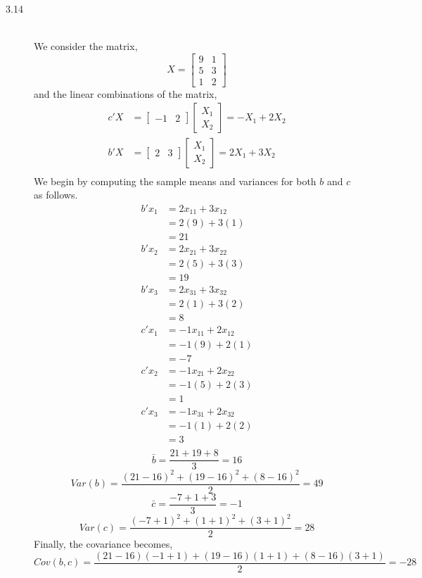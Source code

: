 \documentclass[letterpaper,10pt]{article}
\begin{document}
\begin{description}
\item[3.14]\hfill\\
We consider the matrix,
\[X=\begin{bmatrix}
9 & 1\\5 & 3\\1 & 2
\end{bmatrix} \]
and the linear combinations of the matrix,
\begin{align*}
c'X &=\begin{bmatrix}
-1 & 2
\end{bmatrix}\begin{bmatrix}
X_1\\X_2
\end{bmatrix}=-X_1+2X_2\\
b'X&=\begin{bmatrix}
2 & 3
\end{bmatrix}\begin{bmatrix}
X_1\\X_2
\end{bmatrix}=2X_1+3X_2\\
\end{align*}
We begin by computing the sample means and variances for both $b$ and $c$ as follows.
\begin{align*}
b'x_1 &= 2x_{11}+3x_{12}\\
&=2(9)+3(1)\\
&=21\\
b'x_2 &= 2x_{21}+3x_{22}\\
&=2(5)+3(3)\\
&=19\\
b'x_3 &= 2x_{31}+3x_{32}\\
&=2(1)+3(2)\\
&=8\\
c'x_1 &=-1x_{11}+2x_{12}\\
&=-1(9)+2(1)\\
&=-7\\
c'x_2 &=-1x_{21}+2x_{22}\\
&=-1(5)+2(3)\\
&=1\\
c'x_3 &=-1x_{31}+2x_{32}\\
&=-1(1)+2(2)\\
&=3\\
\end{align*}
\[\bar{b}=\frac{21+19+8}{3}=16\]
\[Var(b)=\frac{(21-16)^2+(19-16)^2+(8-16)^2}{2}=49\]
\[\bar{c}=\frac{-7+1+3}{3}=-1\]
\[Var(c)=\frac{(-7+1)^2+(1+1)^2+(3+1)^2}{2}=28\]
Finally, the covariance becomes,
\[Cov(b,c)=\frac{(21-16)(-1+1)+(19-16)(1+1)+(8-16)(3+1)}{2}=-28\]

\end{description}
\end{document}
